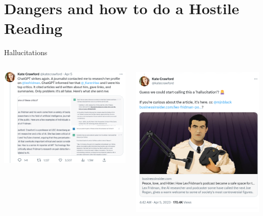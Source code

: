 \documentclass[aspectratio=169]{beamer}
\begin{document}
\section{Dangers and how to do a Hostile Reading}
\begin{frame}{Hallucitations}
\begin{columns}[t]
\begin{column}{.6\textwidth}
    \centering
    \includegraphics[width=\textwidth]{Figures/Screenshot from 2023-06-05 18-24-24.png}
\end{column}
\begin{column}{.4\textwidth}
    \centering
        \includegraphics[width=\textwidth]{Figures/Screenshot from 2023-06-05 18-19-43.png}
\end{column}
\end{columns}
 

\end{frame}
\end{document}
